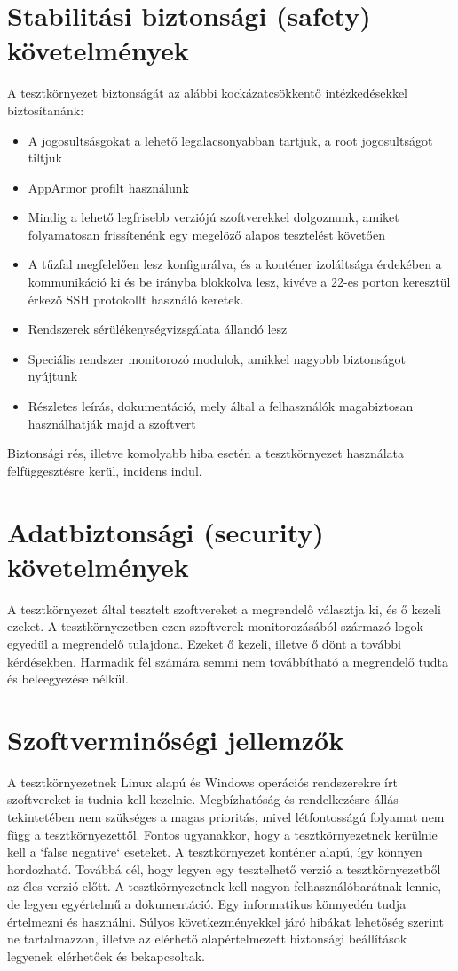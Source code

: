 \documentclass{scrreprt}
\begin{document}
\section{Stabilitási biztonsági (safety) követelmények}
A tesztkörnyezet biztonságát az alábbi kockázatcsökkentő intézkedésekkel biztosítanánk:
\begin{itemize}
      \item A jogosultsásgokat a lehető legalacsonyabban tartjuk, a root jogosultságot tiltjuk
      \item AppArmor profilt használunk
      \item Mindig a lehető legfrisebb verziójú szoftverekkel dolgoznunk, amiket folyamatosan frissítenénk egy megelöző alapos tesztelést követően
      \item A tűzfal megfelelően lesz konfigurálva, és a konténer izoláltsága érdekében a kommunikáció ki és be irányba blokkolva lesz, kivéve a 22-es porton keresztül
            érkező SSH protokollt használó keretek.
      \item Rendszerek sérülékenységvizsgálata állandó lesz
      \item Speciális rendszer monitorozó modulok, amikkel nagyobb biztonságot nyújtunk
      \item Részletes leírás, dokumentáció, mely által a felhasználók magabiztosan használhatják majd a szoftvert
\end{itemize}
Biztonsági rés, illetve komolyabb hiba esetén a tesztkörnyezet használata felfüggesztésre kerül, incidens indul.

\section{Adatbiztonsági (security) követelmények}
A tesztkörnyezet által tesztelt szoftvereket a megrendelő választja ki, és ő kezeli ezeket. A tesztkörnyezetben ezen szoftverek monitorozásából származó logok
egyedül a megrendelő tulajdona. Ezeket ő kezeli, illetve ő dönt a további kérdésekben. Harmadik fél számára semmi nem továbbítható a megrendelő tudta és
beleegyezése nélkül.

\section{Szoftverminőségi jellemzők}
A tesztkörnyezetnek Linux alapú és Windows operációs rendszerekre írt szoftvereket is tudnia kell kezelnie. Megbízhatóság és rendelkezésre állás tekintetében
nem szükséges a magas prioritás, mivel létfontosságú folyamat nem függ a tesztkörnyezettől. Fontos ugyanakkor, hogy a tesztkörnyezetnek kerülnie kell a `false
negative` eseteket. A tesztkörnyezet konténer alapú, így könnyen hordozható. Továbbá cél, hogy legyen egy tesztelhető verzió a tesztkörnyezetből az éles verzió
előtt. A tesztkörnyezetnek kell nagyon felhasználóbarátnak lennie, de legyen egyértelmű a dokumentáció. Egy informatikus könnyedén tudja értelmezni és
használni. Súlyos következményekkel járó hibákat lehetőség szerint ne tartalmazzon, illetve az elérhető alapértelmezett biztonsági beállítások legyenek
elérhetőek és bekapcsoltak.
\end{document}
